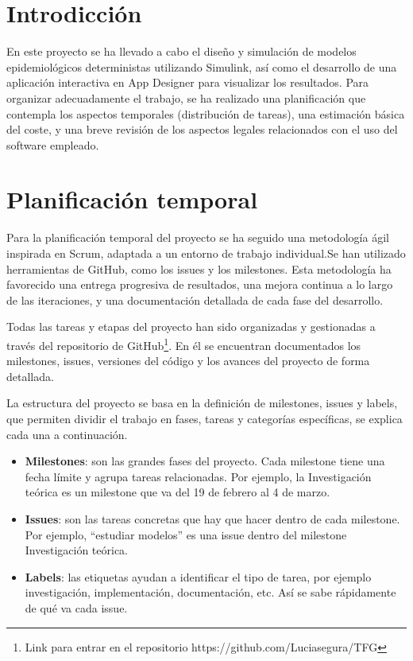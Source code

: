 
\section{Introdicción}
En este proyecto se ha llevado a cabo el diseño y simulación de modelos epidemiológicos deterministas utilizando Simulink, así como el desarrollo de una aplicación interactiva en App Designer para visualizar los resultados. Para organizar adecuadamente el trabajo, se ha realizado una planificación que contempla los aspectos temporales (distribución de tareas), una estimación básica del coste, y una breve revisión de los aspectos legales relacionados con el uso del software empleado.

\section{Planificación temporal}
Para la planificación temporal del proyecto se ha seguido una metodología ágil inspirada en Scrum, adaptada a un entorno de trabajo individual.Se han utilizado herramientas de GitHub, como los issues y los milestones. Esta metodología ha favorecido una entrega progresiva de resultados, una mejora continua a lo largo de las iteraciones, y una documentación detallada de cada fase del desarrollo.

Todas las tareas y etapas del proyecto han sido organizadas y gestionadas a través del repositorio de GitHub\footnote{Link para entrar en el repositorio https://github.com/Luciasegura/TFG}. En él se encuentran documentados los milestones, issues, versiones del código y los avances del proyecto de forma detallada.

La estructura del proyecto se basa en la definición de milestones, issues y labels, que permiten dividir el trabajo en fases, tareas y categorías específicas, se explica cada una a continuación.
\begin{itemize}
    \item \textbf{Milestones}: son las grandes fases del proyecto. Cada milestone tiene una fecha límite y agrupa tareas relacionadas. Por ejemplo, la Investigación teórica es un milestone que va del 19 de febrero al 4 de marzo.
    \item \textbf{Issues}: son las tareas concretas que hay que hacer dentro de cada milestone. Por ejemplo, “estudiar modelos” es una issue dentro del milestone Investigación teórica.
    \item \textbf{Labels}: las etiquetas ayudan a identificar el tipo de tarea, por ejemplo investigación, implementación, documentación, etc. Así se sabe rápidamente de qué va cada issue.
\end{itemize}



